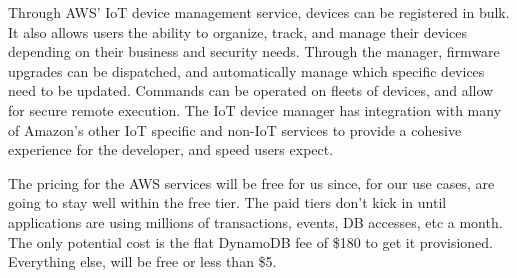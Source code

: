 Through AWS' IoT device management service, devices can be registered in bulk. It also allows users
the ability to organize, track, and manage their devices depending on their business and security
needs. Through the manager, firmware upgrades can be dispatched, and automatically manage which
specific devices need to be updated. Commands can be operated on fleets of devices, and allow for
secure remote execution. The IoT device manager has integration with many of Amazon's other IoT
specific and non-IoT services to provide a cohesive experience for the developer, and speed users
expect. 

The pricing for the AWS services will be free for us since, for our use cases, are going to stay
well within the free tier. The paid tiers don't kick in until applications are using millions of
transactions, events, DB accesses, etc a month. The only potential cost is the flat DynamoDB fee of
\$180 to get it provisioned. Everything else, will be free or less than \$5.

%
%

